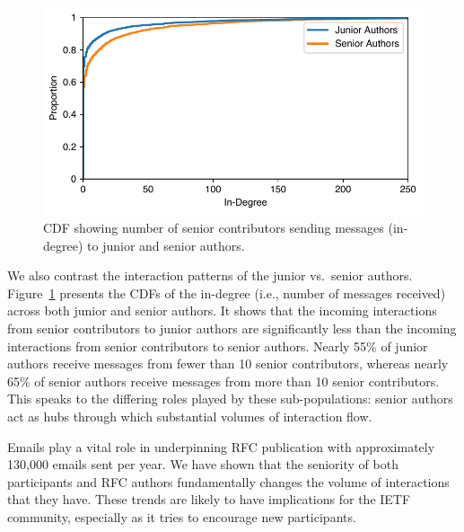 \documentclass[twocolumn,10pt]{article}
\newlength{\figureWidthOneColumn}
\newcommand{\pb}[1]{\vspace{0.75ex}\noindent{\textbf{#1}}}
\begin{document}
\begin{figure}
  \centering
  \includegraphics[width=\figureWidthOneColumn]{figures-prev/imc-2021/emails/junior_senior_authors_seniormem_indegree.pdf}
  \caption{
    CDF showing number of senior contributors sending messages (in-degree)
    to junior and senior authors.
  }
  \label{fig:junior_senior_indegree_seniormem}
\end{figure}

We also contrast the interaction patterns of the junior vs.\ senior
authors. Figure~\ref{fig:junior_senior_indegree_seniormem} presents the
CDFs of the in-degree (i.e., number of messages received) across both
junior and senior authors. It shows that the incoming interactions from
senior contributors to junior authors are significantly less than the
incoming interactions from senior contributors to senior authors. Nearly
55\% of junior authors receive messages from fewer than 10 senior
contributors, whereas nearly 65\% of senior authors receive messages from
more than 10 senior contributors.  This speaks to the differing roles
played by these sub-populations: senior authors act as hubs through which
substantial volumes of interaction flow.

\pb{Summary:}
Emails play a vital role in underpinning RFC publication with approximately
130,000 emails sent per year. We have shown that the seniority of both
participants and RFC authors fundamentally changes the volume of
interactions that they have. These trends are likely to have implications
for the IETF community, especially as it tries to encourage new
participants.



\end{document}
